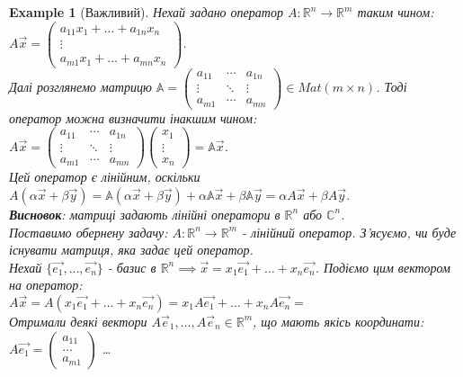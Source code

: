\documentclass[a4paper, 10pt]{article}
\theoremstyle{theoremdd}
\newtheorem{example}[theorem]{Example}
\begin{document}
	\begin{example}[Важливий]
	\label{important_ex1}
	Нехай задано оператор $A: \mathbb{R}^n \to \mathbb{R}^m$ таким чином:\\
	$A\vec{x} = \begin{pmatrix}
	a_{11}x_1 + \dots + a_{1n}x_n \\
	\vdots \\
	a_{m1}x_1 + \dots + a_{mn}x_n
	\end{pmatrix}$.\\
	Далі розглянемо матрицю $\displaystyle \mathbb{A} = \begin{pmatrix}
	a_{11} & \cdots &  a_{1n} \\
	\vdots & \ddots & \vdots \\
	a_{m1} & \cdots & a_{mn}
	\end{pmatrix} \in Mat(m \times n)
	$. Тоді оператор можна визначити інакшим чином:\\
	$A\vec{x} = \begin{pmatrix}
	a_{11} & \cdots &  a_{1n} \\
	\vdots & \ddots & \vdots \\
	a_{m1} & \cdots & a_{mn}
	\end{pmatrix} \begin{pmatrix}
	x_1 \\ \vdots \\ x_n
	\end{pmatrix} = \mathbb{A} \vec{x}$.\\
	Цей оператор є лінійним, оскільки $A(\alpha \vec{x} + \beta \vec{y}) = \mathbb{A}(\alpha \vec{x} + \beta \vec{y})+ \alpha \mathbb{A} \vec{x} + \beta \mathbb{A} \vec{y} = \alpha A \vec{x} + \beta A \vec{y}$.\\
	\textbf{Висновок}: матриці задають лінійні оператори в $\mathbb{R}^n$ або $\mathbb{C}^n$.
	\bigskip \\
	Поставимо обернену задачу: $A: \mathbb{R}^n \to \mathbb{R}^m$ - лінійний оператор. З'ясуємо, чи буде існувати матриця, яка задає цей оператор.\\
	Нехай $\{\vec{e_1},\dots, \vec{e_n}\}$ - базис в $\mathbb{R}^n \implies \vec{x} = x_1\vec{e_1} + \dots + x_n\vec{e_n}$. Подіємо цим вектором на оператор:\\
	$A\vec{x} = A(x_1\vec{e_1} + \dots + x_n\vec{e_n}) = x_1A\vec{e_1} + \dots + x_nA\vec{e_n} \boxed{=}$\\
	Отримали деякі вектори $A\vec{e}_1, \dots, A\vec{e}_n \in \mathbb{R}^m$, що мають якісь координати:\\
	$A\vec{e_1} = \begin{pmatrix} a_{11} \\ \dots \\ a_{m1} \end{pmatrix}$ \hspace{0.5cm} \dots \hspace{0.5cm}

\end{example}
\end{document}
